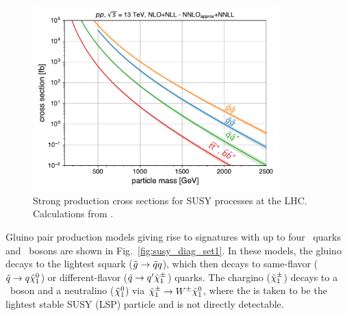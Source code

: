 \begin{figure}[htb!]
    \centering
    \includegraphics[width=0.85\textwidth]{figs/ssan/plot_susy_xsecs}
\caption{Strong production cross sections for SUSY processes at the LHC. Calculations from \cite{THEORY:SUSYxsecs}.}
\label{fig:susy_xsecs}
\end{figure}

Gluino pair production models giving rise to signatures with up to four \cPqb\
quarks and \PW\ bosons are shown in Fig.~\ref{fig:susy_diag_set1}. In
these models, the gluino decays to the lightest squark ($\tilde{g} \to \tilde{q}
q$), which then decays to same-flavor ($\tilde{q} \to q \tilde{\chi}_1^0$) or
different-flavor ($\tilde{q} \to q' \tilde{\chi}_1^{\pm}$) quarks. The chargino
($\tilde{\chi}_1^{\pm}$) decays to a \PW\ boson and a neutralino ($\tilde{\chi}_1^0$) via $\tilde{\chi}_1^{\pm}
\to W^{\pm} \tilde{\chi}_1^0$, where the \lsp is taken to be the lightest stable SUSY (LSP)
particle and is not directly detectable.

